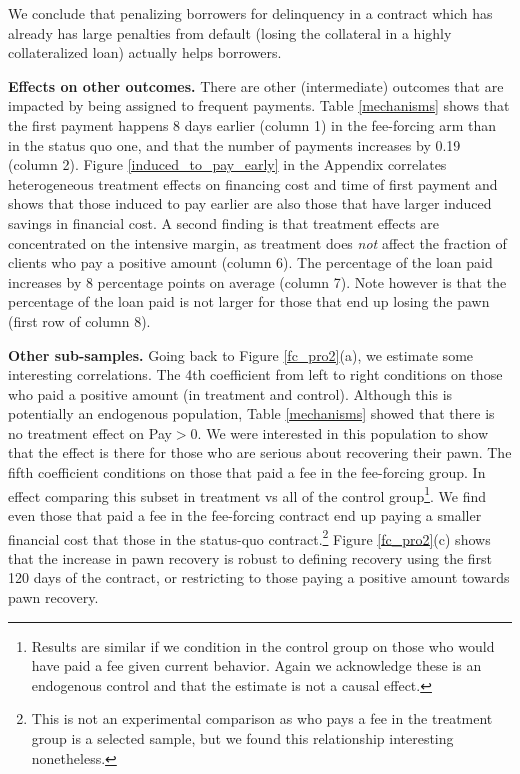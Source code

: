 \documentclass[11pt]{article}
\begin{document}

\vspace{.2in}
\noindent We conclude that penalizing borrowers for delinquency in a contract which has already has large penalties from default (losing the collateral in a highly collateralized loan) actually helps borrowers.

\vspace{.2in}
\noindent \textbf{Effects on other outcomes.} There are other (intermediate) outcomes that are impacted by being assigned to frequent payments. Table \ref{mechanisms} shows that the first payment happens 8 days earlier (column 1) in the fee-forcing arm than in the status quo one, and that the number of payments increases by 0.19 (column 2). Figure \ref{induced_to_pay_early} in the Appendix correlates heterogeneous treatment effects on financing cost and time of first payment and shows that those induced to pay earlier are also those that have larger induced savings in financial cost. A second finding is that treatment effects are concentrated on the intensive margin, as treatment does \textit{not} affect the fraction of clients who pay a positive amount (column 6). The percentage of the loan paid increases by 8 percentage points on average (column 7). Note however is that the percentage of the loan paid is not larger for those that end up losing the pawn (first row of column 8).

\vspace{.2in}
\noindent \textbf{Other sub-samples.} Going back to Figure \ref{fc_pro2}(a), we estimate some interesting correlations. The 4th coefficient from left to right conditions on those who paid a positive amount (in treatment and control). Although this is potentially an endogenous population, Table \ref{mechanisms} showed that there is no treatment effect on Pay$>0$. We were interested in this population to show that the effect is there for those who are serious about recovering their pawn. The fifth coefficient conditions on those that paid a fee in the fee-forcing group. In effect comparing this subset in treatment vs all of the control group\footnote{Results are similar if we condition in the control group on those who would have paid a fee given current behavior. Again we acknowledge these is an endogenous control and that the estimate is not a causal effect.}. We find even those that paid a fee in the fee-forcing contract end up paying a smaller financial cost that those in the status-quo contract.\footnote{This is not an experimental comparison as who pays a fee in the treatment group is a selected sample, but we found this relationship interesting nonetheless.} Figure \ref{fc_pro2}(c) shows that the increase in pawn recovery is robust to defining recovery using the first 120 days of the contract, or restricting to those paying a positive amount towards pawn recovery.
\end{document}
